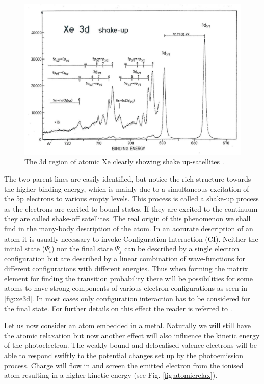 \begin{figure}[h!]
	\begin{center}
	\includegraphics[width=\textwidth]{figures/04_15.png}
	\caption{The 3d region of atomic Xe clearly showing shake up-satellites \cite{siegbahn1}.}
	\label{fig:xe3d}
	\end{center}
\end{figure}

The two parent lines are easily identified, but notice the rich structure towards the higher binding energy, which is mainly due to a simultaneous excitation of the 5p electrons to various empty levels. This process is called a shake-up process as the electrons are excited to bound states. If they are excited to the continuum they are called shake-off satellites. The real origin of this phenomenon we shall find in the many-body description of the atom. In an accurate description of an atom it is  usually necessary to invoke Configuration Interaction (CI). Neither the initial state ($\Psi_{i}$) nor the final state  $\Psi_{f}$ can be described by a single  electron configuration but are described by a linear combination of wave-functions  for different configurations with different energies. Thus when forming  the matrix element for finding the  transition probability there will be possibilities for some atoms to have strong components of various electron configurations as seen in \autoref{fig:xe3d}.  In most cases only configuration interaction has to be considered for the  final state. For further details on this effect the reader is referred to \cite{shirley}.

Let us now consider an atom embedded in a metal. Naturally we will still have the atomic relaxation but now another effect will also influence the kinetic energy of the photoelectron. The weakly bound and delocalised valence electrons will be able to respond swiftly to the potential changes set up by the photoemission process. Charge will flow in and screen the emitted electron from the ionised atom resulting in a higher kinetic energy (see Fig. \ref{fig:atomicrelax}).


